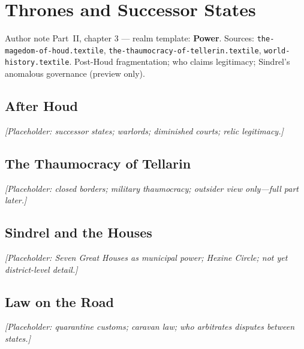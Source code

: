 \chapter{Thrones and Successor States}

\begin{DndComment}{Author note}
  Part~II, chapter 3 --- realm template: \textbf{Power}.
  Sources: \texttt{the-magedom-of-houd.textile}, \texttt{the-thaumocracy-of-tellerin.textile}, \texttt{world-history.textile}.
  Post-Houd fragmentation; who claims legitimacy; Sindrel's anomalous governance (preview only).
\end{DndComment}

\section{After Houd}

\textit{[Placeholder: successor states; warlords; diminished courts; relic legitimacy.]}

\section{The Thaumocracy of Tellarin}

\textit{[Placeholder: closed borders; military thaumocracy; outsider view only---full part later.]}

\section{Sindrel and the Houses}

\textit{[Placeholder: Seven Great Houses as municipal power; Hexine Circle; not yet district-level detail.]}

\section{Law on the Road}

\textit{[Placeholder: quarantine customs; caravan law; who arbitrates disputes between states.]}
